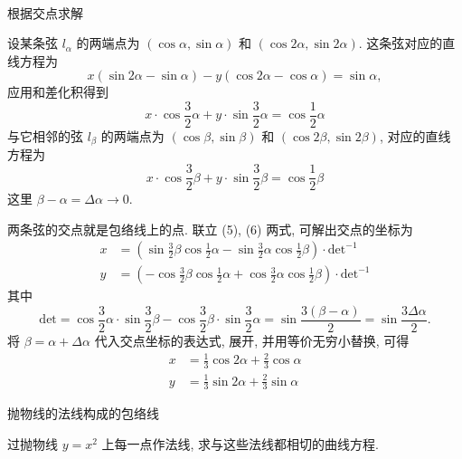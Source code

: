 ~

\noindent 根据交点求解

设某条弦 $l_{\alpha}$ 的两端点为 $(\cos\alpha,\sin\alpha)$ 和 $(\cos 2\alpha, \sin 2\alpha)$. 这条弦对应的直线方程为
\[ x(\sin 2\alpha - \sin\alpha) - y(\cos 2\alpha - \cos\alpha) = \sin\alpha ,\]
应用和差化积得到
\[ x\cdot\cos\frac{3}{2}\alpha + y\cdot\sin\frac{3}{2}\alpha = \cos\frac{1}{2}\alpha  \tag{5} \]
与它相邻的弦 $l_{\beta}$ 的两端点为 $(\cos\beta,\sin\beta)$ 和 $(\cos 2\beta, \sin 2\beta)$, 对应的直线方程为
\[ x\cdot\cos\frac{3}{2}\beta + y\cdot\sin\frac{3}{2}\beta = \cos\frac{1}{2}\beta  \tag{6} \]
这里 $\beta - \alpha = \Delta\alpha \to 0$. 

两条弦的交点就是包络线上的点. 联立 (5), (6) 两式, 可解出交点的坐标为
\begin{align*}
x&= \left( \sin\frac{3}{2}\beta\cos\frac{1}{2}\alpha - \sin\frac{3}{2}\alpha\cos\frac{1}{2}\beta \right)\cdot\mathrm{det}^{-1} \\
y&= \left( -\cos\frac{3}{2}\beta\cos\frac{1}{2}\alpha + \cos\frac{3}{2}\alpha\cos\frac{1}{2}\beta \right)\cdot\mathrm{det}^{-1}
\end{align*}
其中 
$$\mathrm{det} = \cos\frac{3}{2}\alpha\cdot\sin\frac{3}{2}\beta - \cos\frac{3}{2}\beta\cdot\sin\frac{3}{2}\alpha = \sin\frac{3(\beta-\alpha)}{2} = \sin\frac{3\Delta\alpha}{2} .$$
将 $\beta = \alpha + \Delta\alpha$ 代入交点坐标的表达式, 展开, 并用等价无穷小替换, 可得
\begin{align*}
x &= \frac{1}{3}\cos 2\alpha + \frac{2}{3}\cos\alpha \\
y &= \frac{1}{3}\sin 2\alpha + \frac{2}{3}\sin\alpha
\end{align*}


\newpage

\noindent 抛物线的法线构成的包络线

过抛物线 $y = x^2$ 上每一点作法线, 求与这些法线都相切的曲线方程.
\begin{figure*}[htbp]
\centering
{}
\end{figure*}

